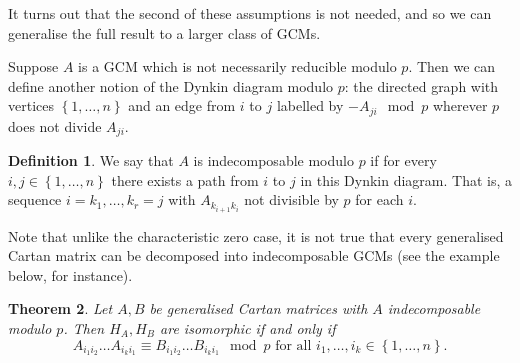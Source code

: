 \documentclass[11pt,a4paper]{report}
\newtheorem{theorem}{Theorem}[chapter]
\theoremstyle{definition}
\newtheorem{definition}[theorem]{Definition}
\begin{document}
It turns out that the second of these assumptions is not needed, and so we can generalise the full result to a larger class of GCMs. 

Suppose $A$ is a GCM which is not necessarily reducible modulo $p$. Then we can define another notion of the Dynkin diagram modulo $p$: the directed graph with vertices $\left\{1, \ldots, n\right\}$ and an edge from $i$ to $j$ labelled by $-A_{ji} \mod p$ wherever $p$ does not divide $A_{ji}$.

\begin{definition}We say that $A$ is indecomposable modulo $p$ if for every $i, j \in \left\{1, \ldots, n\right\}$ there exists a path from $i$ to $j$ in this Dynkin diagram. That is, a sequence $i = k_1, \ldots, k_r = j$ with $A_{k_{i+1} k_i}$ not divisible by $p$ for each $i$.\end{definition}

Note that unlike the characteristic zero case, it is not true that every generalised Cartan matrix can be decomposed into indecomposable GCMs (see the example below, for instance). 

\begin{theorem}Let $A, B$ be generalised Cartan matrices with $A$ indecomposable modulo $p$. Then $H_A, H_B$ are isomorphic if and only if \begin{equation*}A_{i_1i_2} \ldots A_{i_{k} i_1} \equiv B_{i_1i_2} \ldots B_{i_ki_1} \mod p \text{ for all } i_1, \ldots , i_k \in \left\{1, \ldots, n\right\} .\end{equation*}\end{theorem}
\end{document}
